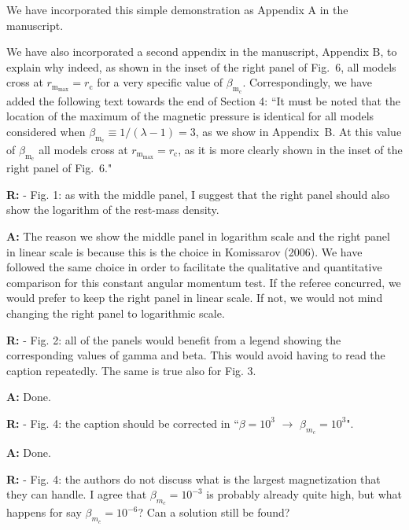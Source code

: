 \documentclass{article}
\begin{document}
\bigskip

We have incorporated this simple demonstration as Appendix A in the manuscript.

\bigskip

We have also incorporated a second appendix in the manuscript, Appendix B, to explain why indeed, as shown in the inset of the right panel of Fig.~6, all models cross at $r_{\mathrm{m}_{\mathrm{max}}} = r_{\mathrm{c}}$ for a very specific value of $\beta_{\mathrm{m}_{\mathrm{c}}}$. Correspondingly, we have added the following text towards the end of Section 4: ``{It must be noted that the location of the maximum of the magnetic pressure is identical for all models considered when $\beta_{\mathrm{m}_{\mathrm{c}}} \equiv 1/(\lambda - 1) = 3$, as we show in Appendix~B. At this value of $\beta_{\mathrm{m}_{\mathrm{c}}}$ all models cross at $r_{\mathrm{m}_{\mathrm{max}}} = r_{\mathrm{c}}$, as it is more clearly shown in the inset of the right panel of Fig.~6.}"

\bigskip

{\bf R:} - Fig. 1: as with the middle panel, I suggest that the right
panel should also show the logarithm of the rest-mass density.

\bigskip

{\bf A:} The reason we show the middle panel in logarithm scale and the right panel in linear scale is because this is the choice 
 in Komissarov (2006). We have followed the same choice in order to facilitate the qualitative and quantitative comparison
for this constant angular momentum test. If the referee concurred, we would prefer to keep the right panel in linear scale. If not, we would
not mind changing the right panel to logarithmic scale.

\bigskip

{\bf R:} - Fig. 2: all of the panels would benefit from a legend showing the
corresponding values of gamma and beta. This would avoid having to read the caption repeatedly. The same is true also for Fig. 3.

\bigskip

{\bf A:} Done.

\bigskip

{\bf R:} - Fig. 4: the caption should be corrected in ``$\beta = 10^3$ $\rightarrow $ $\beta_{m_c}
= 10^3$".

\bigskip

{\bf A:} Done.

\bigskip

{\bf R:} - Fig. 4: the authors do not discuss what is the largest magnetization
that they can handle. I agree that $\beta_{m_c} = 10^{-3}$ is probably
already quite high, but what happens for say $\beta_{m_c} = 10^{-6}$? Can
a solution still be found?
\end{document}
